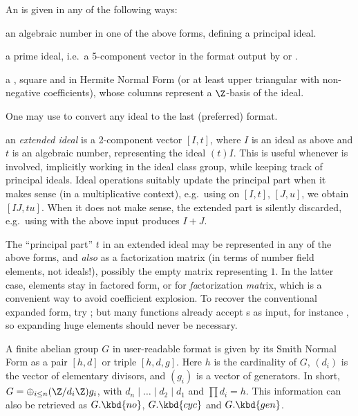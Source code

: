 \noindent An  is given in any of the following ways:

\item an algebraic number in one of the above forms, defining a principal ideal.

\item a prime ideal, i.e.~a 5-component vector in the format output by
 or .

\item a , square and in Hermite Normal Form (or at least
upper triangular with non-negative coefficients), whose columns represent a
$\Z$-basis of the ideal.

One may use  to convert any ideal to the last (preferred) format.

\item an \emph{extended ideal}  is a 2-component
vector $[I, t]$, where $I$ is an ideal as above and $t$ is an algebraic
number, representing the ideal $(t)I$. This is useful whenever 
is involved, implicitly working in the ideal class group, while keeping track
of principal ideals. Ideal operations suitably update the principal part
when it makes sense (in a multiplicative context), e.g.~using 
on $[I,t]$, $[J,u]$, we obtain $[IJ, tu]$. When it does not make sense, the
extended part is silently discarded, e.g.~using  with the above
input produces $I+J$.

The ``principal part'' $t$ in an extended ideal may be
represented in any of the above forms, and \emph{also} as a factorization
matrix (in terms of number field elements, not ideals!), possibly the empty
matrix \kbd{[;]} representing $1$. In the latter case, elements stay in
factored form, or  for \emph{fa}ctorization \emph{mat}rix, which
is a convenient way to avoid coefficient explosion. To recover the
conventional expanded form, try ; but many functions
already accept s as input, for instance , so
expanding huge elements should never be necessary.


A finite abelian group $G$ in user-readable format is given by its Smith
Normal Form as a pair $[h,d]$ or triple $[h,d,g]$.
Here $h$ is the cardinality of $G$, $(d_i)$ is the vector of elementary
divisors, and $(g_i)$ is a vector of generators. In short,
$G = \oplus_{i\leq n} (\Z/d_i\Z) g_i$, with $d_n \mid \dots \mid d_2 \mid d_1$
and $\prod d_i = h$. This information can also be retrieved as
$G.\kbd{no}$, $G.\kbd{cyc}$ and $G.\kbd{gen}$.

